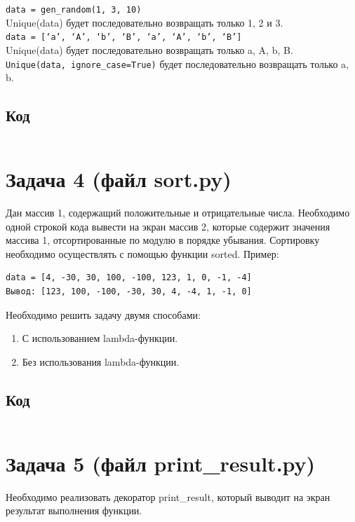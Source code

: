 \documentclass[20pt,a4paper]{report}
\begin{document}
		\small \texttt{data = gen_random(1, 3, 10)} \\ \large
		Unique(data) будет последовательно возвращать только 1, 2 и 3. \\

		\small \texttt{data = [‘a’, ‘A’, ‘b’, ‘B’, ‘a’, ‘A’, ‘b’, ‘B’]} \\ \large
		Unique(data) будет последовательно возвращать только a, A, b, B. \\

		\small \texttt{Unique(data, ignore_case=True)} \large будет последовательно возвращать только a, b.

		\subsection{Код}
			\small
			\inputminted[tabsize=4, linenos]{python}{unique.py}
			\large

		\section{Задача 4 (файл sort.py)}
		\qquad Дан массив 1, содержащий положительные и отрицательные числа. Необходимо одной строкой кода вывести на экран массив 2, которые содержит значения массива 1, отсортированные по модулю в порядке убывания. Сортировку необходимо осуществлять с помощью функции sorted. Пример: \\
		\small
		\begin{verbatim}
data = [4, -30, 30, 100, -100, 123, 1, 0, -1, -4]
Вывод: [123, 100, -100, -30, 30, 4, -4, 1, -1, 0]
		\end{verbatim}
		\large
		\qquad Необходимо решить задачу двумя способами:
		\begin{enumerate}
			\item С использованием lambda-функции.
			\item Без использования lambda-функции.
		\end{enumerate}
		
		\subsection{Код}
			\small
			\inputminted[tabsize=4, linenos]{python}{sort.py}
			\large

		\section{Задача 5 (файл print\_result.py)}
		\qquad Необходимо реализовать декоратор print\_result, который выводит на экран результат выполнения функции. \\
\end{document}
